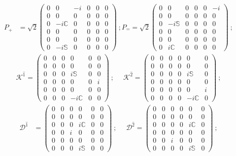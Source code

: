 \documentclass[foundations,article,submit,pdftex,moreauthors]{Definitions/mdpi}
\begin{document}
    \begin{align}
     P_{\hat{+}}&=\sqrt{2}\begin{pmatrix}
        0&0&-i&0&0&0\\
        0&0&0&0&0&0\\
        0&-i\mathbb{C}&0&0&0&0\\
        0&0&0&0&0&0\\
        0&0&0&0&0&0\\
        0&-i\mathbb{S}&0&0&0&0
    \end{pmatrix}~;P_{\hat{-}}=\sqrt{2}\begin{pmatrix}
        0&0&0&0&0&-i\\
        0&0&0&0&0&0\\
        0&-i\mathbb{S}&0&0&0&0\\
        0&0&0&0&0&0\\
        0&0&0&0&0&0\\
        0&i\mathbb{C}&0&0&0&0
    \end{pmatrix}~;\nonumber
    \end{align}
    \begin{align}
        \mathcal{K}^{\hat{1}}=\begin{pmatrix}
        0&0&0&0&0&0\\
        0&0&0&0&0&0\\
        0&0&0&i\mathbb{S}&0&0\\
        0&0&0&0&0&i\\
        0&0&0&0&0&0\\
        0&0&0&-i\mathbb{C}&0&0
    \end{pmatrix}~;~~~~~~\mathcal{K}^{\hat{2}}=\begin{pmatrix}
        0&0&0&0&0&0\\
        0&0&0&0&0&0\\
        0&0&0&0&i\mathbb{S}&0\\
        0&0&0&0&0&0\\
        0&0&0&0&0&i\\
        0&0&0&0&-i\mathbb{C}&0
    \end{pmatrix}~;\nonumber
    \end{align}
    \begin{align}
    \mathcal{D}^{\hat{1}}&=\begin{pmatrix}
        0&0&0&0&0&0\\
        0&0&0&0&0&0\\
        0&0&0&i\mathbb{C}&0&0\\
        0&0&i&0&0&0\\
        0&0&0&0&0&0\\
        0&0&0&i\mathbb{S}&0&0
    \end{pmatrix}~;~~~~~~\mathcal{D}^{\hat{2}}=\begin{pmatrix}
        0&0&0&0&0&0\\
        0&0&0&0&0&0\\
        0&0&0&0&i\mathbb{C}&0\\
        0&0&0&0&0&0\\
        0&0&i&0&0&0\\
        0&0&0&0&i\mathbb{S}&0
    \end{pmatrix}~;\nonumber
    \end{align}
\end{document}
